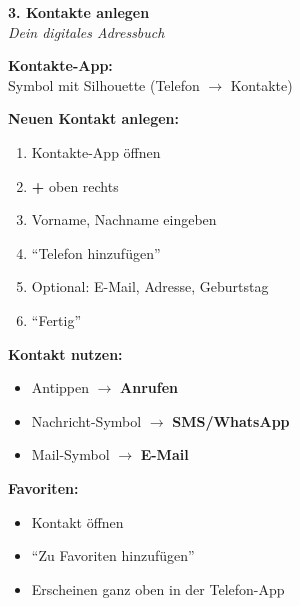 \documentclass[a4paper,landscape,8pt]{extarticle}
\begin{document}
\hfill%
\begin{minipage}[t]{0.32\linewidth}
\begin{center}
\colorbox{contactblue!15}{%
\begin{minipage}{0.95\linewidth}
\vspace{2mm}
\begin{center}
{\Large\bfseries\textcolor{contactblue}{3. Kontakte anlegen}}\\[1pt]
{\footnotesize\itshape Dein digitales Adressbuch}
\end{center}
\vspace{2mm}
\end{minipage}%
}
\end{center}

\vspace{1mm}

\textbf{Kontakte-App:}\\
Symbol mit Silhouette (Telefon $\rightarrow$ Kontakte)

\textbf{Neuen Kontakt anlegen:}
\begin{enumerate}
\item Kontakte-App öffnen
\item \textbf{+} oben rechts
\item Vorname, Nachname eingeben
\item ``Telefon hinzufügen''
\item Optional: E-Mail, Adresse, Geburtstag
\item ``Fertig''
\end{enumerate}

\textbf{Kontakt nutzen:}
\begin{itemize}
\item Antippen $\rightarrow$ \textbf{Anrufen}
\item Nachricht-Symbol $\rightarrow$ \textbf{SMS/WhatsApp}
\item Mail-Symbol $\rightarrow$ \textbf{E-Mail}
\end{itemize}

\textbf{Favoriten:}
\begin{itemize}
\item Kontakt öffnen
\item ``Zu Favoriten hinzufügen''
\item Erscheinen ganz oben in der Telefon-App
\end{itemize}

\end{minipage}

\vspace{1mm}
\end{document}
